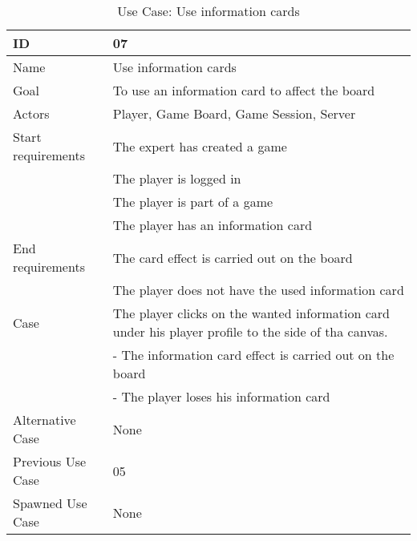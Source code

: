 \begin{table}[H]
\begin{tabular}{|l|l|}
\hline
	\textbf{ID} & \textbf{07}\\ \hline
	Name & Use information cards\\ \hline
	Goal & To use an information card to affect the board\\ \hline
	Actors & Player, Game Board, Game Session, Server\\ \hline
	Start requirements & The expert has created a game\\
				& The player is logged in\\
				& The player is part of a game\\
				& The player has an information card \\ \hline
	End requirements & The card effect is carried out on the board\\
				& The player does not have the used information card \\ \hline
	Case & The player clicks on the wanted information card under his player profile to the side of tha canvas.\\
		&- The information card effect is carried out on the board\\
		&- The player loses his information card \\ \hline
	Alternative Case & None \\ \hline
	Previous Use Case & 05\\ \hline
	Spawned Use Case & None\\ \hline
\end{tabular}
\caption{Use Case: Use information cards}
\label{fig:usecase07table}
\end{table}


